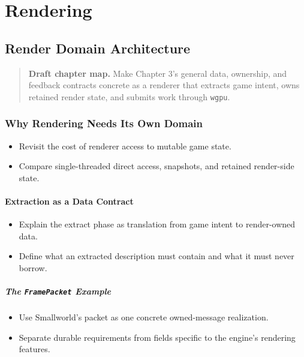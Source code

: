 \documentclass[
  11pt,
  letterpaper,
  DIV=11,
  numbers=noendperiod,
  twoside,
  open=right]{scrreprt}
\providecommand{\tightlist}{%
  \setlength{\itemsep}{0pt}\setlength{\parskip}{0pt}}
\begin{document}
\part{Rendering}

\chapter{Render Domain Architecture}\label{render-domain-architecture}

\begin{quote}
\textbf{Draft chapter map.} Make Chapter 3's general data, ownership,
and feedback contracts concrete as a renderer that extracts game intent,
owns retained render state, and submits work through \texttt{wgpu}.
\end{quote}

\section{Why Rendering Needs Its Own
Domain}\label{why-rendering-needs-its-own-domain}

\begin{itemize}
\tightlist
\item
  Revisit the cost of renderer access to mutable game state.
\item
  Compare single-threaded direct access, snapshots, and retained
  render-side state.
\end{itemize}

\subsection{Extraction as a Data
Contract}\label{extraction-as-a-data-contract}

\begin{itemize}
\tightlist
\item
  Explain the extract phase as translation from game intent to
  render-owned data.
\item
  Define what an extracted description must contain and what it must
  never borrow.
\end{itemize}

\subsubsection{\texorpdfstring{The \texttt{FramePacket}
Example}{The FramePacket Example}}\label{the-framepacket-example}

\begin{itemize}
\tightlist
\item
  Use Smallworld's packet as one concrete owned-message realization.
\item
  Separate durable requirements from fields specific to the engine's
  rendering features.
\end{itemize}
\end{document}

